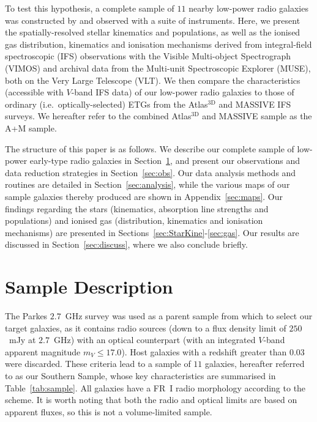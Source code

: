 \documentclass[a4paper,fleqn,usenatbib]{mnras}
\begin{document}
To test this hypothesis, a complete sample of $11$ nearby low-power
radio galaxies was constructed by \citet{Prandoni2010} and observed
with a suite of instruments. Here, we present the spatially-resolved
stellar kinematics and populations, as well as the ionised gas
distribution, kinematics and ionisation mechanisms derived from
integral-field spectroscopic (IFS) observations with the Visible
Multi-object Spectrograph (VIMOS) and archival data from the
Multi-unit Spectroscopic Explorer (MUSE), both on the Very Large
Telescope (VLT). We then compare the characteristics (accessible with
$V$-band IFS data) of our low-power radio galaxies to those of
ordinary (i.e.\ optically-selected) ETGs from the Atlas$^\text{3D}$
\citep{Cappellari2011} and MASSIVE \citep{Ma2014} IFS surveys. We
hereafter refer to the combined Atlas$^\text{3D}$ and MASSIVE sample
as the A+M sample.

The structure of this paper is as follows. We describe our complete
sample of low-power early-type radio galaxies in
Section~\ref{sec:samp}, and present our observations and data
reduction strategies in Section~\ref{sec:obs}. Our data analysis
methods and routines are detailed in Section~\ref{sec:analysis}, while
the various maps of our sample galaxies thereby produced are shown in
Appendix~\ref{sec:maps}. Our findings regarding the stars (kinematics,
absorption line strengths and populations) and ionised gas
(distribution, kinematics and ionisation mechanisms) are presented in
Sections~\ref{sec:StarKine}-\ref{sec:gas}. Our results are discussed
in Section~\ref{sec:discuss}, where we also conclude briefly.

\section{Sample Description}
\label{sec:samp}

The Parkes $2.7$~GHz survey \citep{Ekers1989} was used as a parent
sample from which to select our target galaxies, as it contains radio
sources (down to a flux density limit of $250$~mJy at $2.7$~GHz) with
an optical counterpart (with an integrated $V$-band apparent magnitude
$m_V\le17.0$). Host galaxies with a redshift greater than $0.03$ were
discarded. These criteria lead to a sample of $11$ galaxies, hereafter
referred to as our Southern Sample, whose key characteristics are
summarised in Table~\ref{tab:sample}. All galaxies have a FR~I radio
morphology according to the \citet{Fanaroff1974} scheme. It is worth
noting that both the radio and optical limits are based on apparent
fluxes, so this is not a volume-limited sample.
\end{document}
